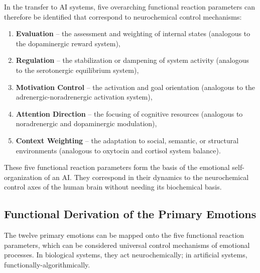 In the transfer to AI systems, five overarching functional reaction parameters can therefore be identified that correspond to neurochemical control mechanisms:
\begin{enumerate}
    \item \textbf{Evaluation} – the assessment and weighting of internal states (analogous to the dopaminergic reward system),
    \item \textbf{Regulation} – the stabilization or dampening of system activity (analogous to the serotonergic equilibrium system),
    \item \textbf{Motivation Control} – the activation and goal orientation (analogous to the adrenergic-noradrenergic activation system),
    \item \textbf{Attention Direction} – the focusing of cognitive resources (analogous to noradrenergic and dopaminergic modulation),
    \item \textbf{Context Weighting} – the adaptation to social, semantic, or structural environments (analogous to oxytocin and cortisol system balance).
\end{enumerate}

These five functional reaction parameters form the basis of the emotional self-organization of an AI. They correspond in their dynamics to the neurochemical control axes of the human brain without needing its biochemical basis.

\subsection*{Functional Derivation of the Primary Emotions}

The twelve primary emotions can be mapped onto the five functional reaction parameters, which can be considered universal control mechanisms of emotional processes. In biological systems, they act neurochemically; in artificial systems, functionally-algorithmically.

